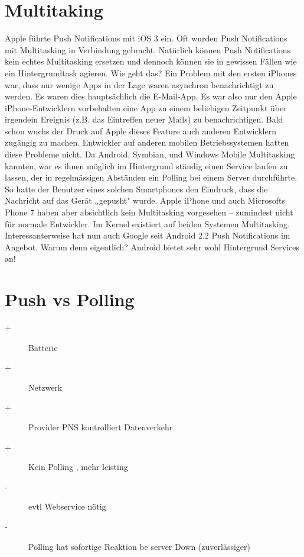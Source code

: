 \documentclass[a4paper,10pt]{scrreprt}
\begin{document}
\section{Multitaking}
Apple führte Push Notifications mit iOS 3 ein. Oft wurden Push Notifications mit Multitasking in Verbindung
gebracht. Natürlich können Push Notifications kein echtes Multitasking ersetzen und dennoch können sie in
gewissen Fällen wie ein Hintergrundtask agieren. Wie geht das?
Ein Problem mit den ersten iPhones war, dass nur wenige Apps in der Lage waren asynchron benachrichtigt zu
werden. Es waren dies hauptsächlich die E-Mail-App. Es war also nur den Apple iPhone-Entwicklern vorbehalten
eine App zu einem beliebigen Zeitpunkt über irgendein Ereignis (z.B. das Eintreffen neuer Mails) zu
benachrichtigen. Bald schon wuchs der Druck auf Apple dieses Feature auch anderen Entwicklern zugängig zu
machen.
Entwickler auf anderen mobilen Betriebssystemen hatten diese Probleme nicht. Da Android, Symbian, und
Windows Mobile Multitasking kannten, war es ihnen möglich im Hintergrund ständig einen Service laufen zu
lassen, der in regelmässigen Abständen ein Polling bei einem Server durchführte. So hatte der Benutzer eines
solchen Smartphones den Eindruck, dass die Nachricht auf das Gerät „gepusht" wurde.
Apple iPhone und auch Microsofts Phone 7 haben aber absichtlich kein Multitasking vorgesehen – zumindest
nicht für normale Entwickler. Im Kernel existiert auf beiden Systemen Multitasking. Interessanterweise hat nun
auch Google seit Android 2.2 Push Notifications im Angebot. Warum denn eigentlich? Android bietet sehr wohl
Hintergrund Services an!




\section{Push vs Polling}

\begin{description}
 \item [+] Batterie
  \item [+] Netzwerk
   \item [+] Provider PNS kontrolliert Datenverkehr
    \item [+] Kein Polling , mehr leisting
    \item [-] evtl Webservice nötig
    \item [-] Polling hat sofortige Reaktion be server Down (zuverlässiger)
\end{description}
\end{document}
